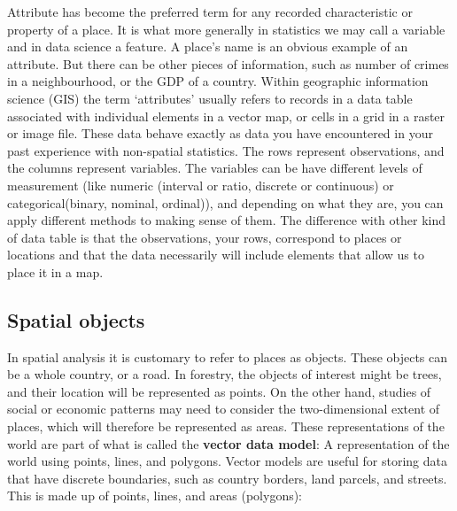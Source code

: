 \documentclass[
]{book}
\begin{document}
Attribute has become the preferred term for any recorded characteristic or property of a place. It is what more generally in statistics we may call a variable and in data science a feature. A place's name is an obvious example of an attribute. But there can be other pieces of information, such as number of crimes in a neighbourhood, or the GDP of a country. Within geographic information science (GIS) the term `attributes' usually refers to records in a data table associated with individual elements in a vector map, or cells in a grid in a raster or image file. These data behave exactly as data you have encountered in your past experience with non-spatial statistics. The rows represent observations, and the columns represent variables. The variables can be have different levels of measurement (like numeric (interval or ratio, discrete or continuous) or categorical(binary, nominal, ordinal)), and depending on what they are, you can apply different methods to making sense of them. The difference with other kind of data table is that the observations, your rows, correspond to places or locations and that the data necessarily will include elements that allow us to place it in a map.

\hypertarget{spatial-objects}{%
\subsection{Spatial objects}\label{spatial-objects}}

In spatial analysis it is customary to refer to places as objects. These objects can be a whole country, or a road. In forestry, the objects of interest might be trees, and their location will be represented as points. On the other hand, studies of social or economic patterns may need to consider the two-dimensional extent of places, which will therefore be represented as areas. These representations of the world are part of what is called the \textbf{vector data model}: A representation of the world using points, lines, and polygons. Vector models are useful for storing data that have discrete boundaries, such as country borders, land parcels, and streets. This is made up of points, lines, and areas (polygons):
\end{document}
